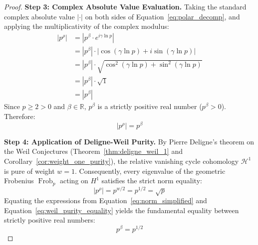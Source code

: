 \documentclass[11pt,a4paper]{article}
\theoremstyle{definition}
\begin{document}
\begin{proof}
\medskip
\noindent\textbf{Step 3: Complex Absolute Value Evaluation.}
Taking the standard complex absolute value $|\cdot|$ on both sides of Equation~\eqref{eq:polar_decomp}, and applying the multiplicativity of the complex modulus:
\begin{align}\label{eq:norm_eval}
|p^\rho| &= \left| p^\beta \cdot e^{i \gamma \ln p} \right| \nonumber\\
&= |p^\beta| \cdot \left| \cos(\gamma \ln p) + i \sin(\gamma \ln p) \right| \nonumber\\
&= |p^\beta| \cdot \sqrt{\cos^2(\gamma \ln p) + \sin^2(\gamma \ln p)} \nonumber\\
&= |p^\beta| \cdot \sqrt{1} \nonumber\\
&= |p^\beta|
\end{align}
Since $p \ge 2 > 0$ and $\beta \in \mathbb{R}$, $p^\beta$ is a strictly positive real number ($p^\beta > 0$). Therefore:
\begin{equation}\label{eq:norm_simplified}
|p^\rho| = p^\beta
\end{equation}

\medskip
\noindent\textbf{Step 4: Application of Deligne-Weil Purity.}
By Pierre Deligne's theorem on the Weil Conjectures (Theorem~\ref{thm:deligne_weil_1} and Corollary~\ref{cor:weight_one_purity}), the relative vanishing cycle cohomology $\mathcal{H}^1$ is pure of weight $w = 1$. Consequently, every eigenvalue of the geometric Frobenius $\operatorname{Frob}_p$ acting on $H^1$ satisfies the strict norm equality:
\begin{equation}\label{eq:weil_purity_equality}
|p^\rho| = p^{w/2} = p^{1/2} = \sqrt{p}
\end{equation}
Equating the expressions from Equation~\eqref{eq:norm_simplified} and Equation~\eqref{eq:weil_purity_equality} yields the fundamental equality between strictly positive real numbers:
\begin{equation}\label{eq:fundamental_real_eq}
p^\beta = p^{1/2}
\end{equation}


\end{proof}
\end{document}
